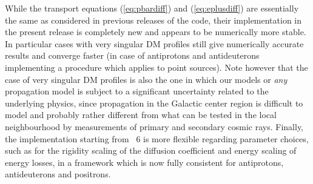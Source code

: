 While the transport equations (\ref{eq:pbardiff}) and (\ref{eq:eplusdiff}) are essentially the same as considered
in previous releases of the code, their implementation in the present release is completely new and appears to be
numerically more stable. In particular cases with very singular DM profiles still give numerically accurate
results and converge faster
(in case of antiprotons and antideuterons implementing a procedure which applies to point sources).
Note however that the case of very singular DM profiles is also the one in which
 our models or 
{\it any} propagation model is subject to a significant uncertainty related to the underlying
physics,
since propagation in the
Galactic center region is difficult to model and probably rather different from what can be tested in the
local neighbourhood by measurements of primary and secondary cosmic rays. Finally, the 
implementation starting from \ds\ 6 is more flexible regarding parameter choices, such as for the 
rigidity scaling of the diffusion
coefficient and energy scaling of energy losses, in a framework which is now fully consistent for
antiprotons, antideuterons and positrons.
